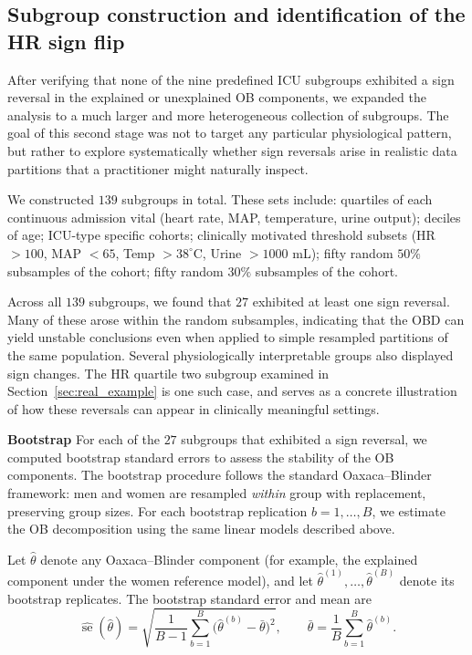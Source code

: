 \subsection*{Subgroup construction and identification of the HR sign flip}

After verifying that none of the nine predefined ICU subgroups exhibited a sign reversal in the explained or unexplained OB components, we expanded the analysis to a much larger and more heterogeneous collection of subgroups. The goal of this second stage was not to target any particular physiological pattern, but rather to explore systematically whether sign reversals arise in realistic data partitions that a practitioner might naturally inspect.

We constructed $139$ subgroups in total. These sets include: quartiles of each continuous admission vital (heart rate, MAP, temperature, urine output);  
deciles of age; ICU-type specific cohorts; clinically motivated threshold subsets (HR $>100$, MAP $<65$, Temp $> 38^\circ$C, Urine $>1000$ mL); fifty random $50\%$ subsamples of the cohort; fifty random $30\%$ subsamples of the cohort.

Across all $139$ subgroups, we found that $27$ exhibited at least one sign reversal. Many of these arose within the random subsamples, indicating that the OBD can yield unstable conclusions even when applied to simple resampled partitions of the same population. Several physiologically interpretable groups also displayed sign changes. The HR quartile two subgroup examined in Section~\ref{sec:real_example} is one such case, and serves as a concrete illustration of how these reversals can appear in clinically meaningful settings.

\textbf{Bootstrap}
For each of the $27$ subgroups that exhibited a sign reversal, we computed bootstrap standard errors to assess the stability of the OB components. The bootstrap procedure follows the standard Oaxaca--Blinder framework: men and women are resampled \emph{within} group with replacement, preserving group sizes. For each bootstrap replication $b=1,\dots,B$, we estimate the OB decomposition using the same linear models described above.


Let $\hat\theta$ denote any Oaxaca--Blinder component (for example, the explained component under the women reference model), and let  
$\hat\theta^{(1)},\dots,\hat\theta^{(B)}$ denote its bootstrap replicates.  
The bootstrap standard error and mean are
\[
    \widehat{\operatorname{se}}(\hat\theta)
    =
    \sqrt{
    \frac{1}{B-1}\sum_{b=1}^B
    \bigl(\hat\theta^{(b)} - \bar\theta\bigr)^2
    },
    \qquad
    \bar\theta = \frac{1}{B}\sum_{b=1}^B \hat\theta^{(b)}.
\]


